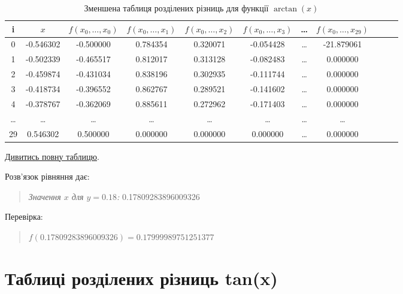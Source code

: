 \documentclass[a4paper, 12pt]{article}
\begin{document}
\hspace*{-2cm}
\begin{table}[ht]
    \centering
    \begin{tabular}{|c|c|c|c|c|c|c|c|c|c|c|}
        \hline
        \textbf{i} & \( x \) & \( f(x_0, \ldots, x_0) \) & \( f(x_0, \ldots, x_1) \) & \( f(x_0, \ldots, x_2) \) & \( f(x_0, \ldots, x_3) \) & \ldots & \( f(x_0, \ldots, x_{29}) \) \\
        \hline
	0 & -0.546302 & -0.500000 &  0.784354 & 0.320071 & -0.054428 & \ldots & -21.879061 \\
	1 & -0.502339 & -0.465517 & 0.812017 & 0.313128 & -0.082483 & \ldots & 0.000000 \\
	2 & -0.459874 & -0.431034 & 0.838196 & 0.302935 & -0.111744 & \ldots & 0.000000 \\
	3 & -0.418734 & -0.396552 & 0.862767 & 0.289521 & -0.141602 & \ldots & 0.000000 \\
	4 & -0.378767 & -0.362069 & 0.885611 & 0.272962 & -0.171403 & \ldots & 0.000000 \\
        \hline
		\ldots & \ldots & \ldots & \ldots & \ldots & \ldots & \ldots & \ldots \\
        \hline
        29 & 0.546302 & 0.500000 & 0.000000 & 0.000000 & 0.000000 & \ldots & 0.000000 \\
        \hline
    \end{tabular}
    \caption{Зменшена таблиця розділених різниць для функції \( \arctan(x) \)}
\end{table}

\hyperref[sec:table2]{Дивитись повну таблицю}.

Розв'язок рівняння дає:

\begin{quote}
\textit{Значення \( x \) для \( y = 0.18 \):} 0.17809283896009326
\end{quote}

Перевірка:

\begin{quote}
\( f(0.17809283896009326) = 0.17999989751251377 \)
\end{quote}

\clearpage
\newpage
\section{Таблиці розділених різниць tan(x)} \label{sec:table1}
\end{document}
